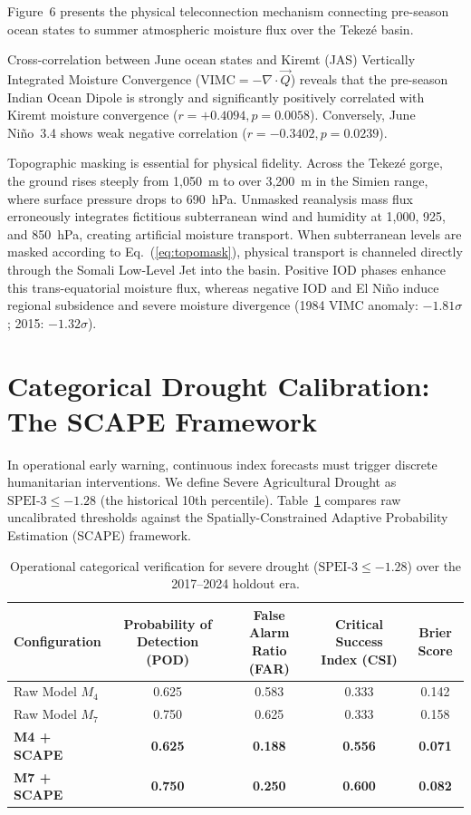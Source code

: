 \documentclass{article}
\begin{document}
Figure~6 presents the physical teleconnection mechanism connecting pre-season ocean states to summer atmospheric moisture flux over the Tekez\'{e} basin. 

Cross-correlation between June ocean states and Kiremt (JAS) Vertically Integrated Moisture Convergence ($\text{VIMC} = -\nabla \cdot \vec{Q}$) reveals that the pre-season Indian Ocean Dipole is strongly and significantly positively correlated with Kiremt moisture convergence ($r = +0.4094, p = 0.0058$). Conversely, June Ni\~{n}o~3.4 shows weak negative correlation ($r = -0.3402, p = 0.0239$).

Topographic masking is essential for physical fidelity. Across the Tekez\'{e} gorge, the ground rises steeply from 1,050~m to over 3,200~m in the Simien range, where surface pressure drops to 690~hPa. Unmasked reanalysis mass flux erroneously integrates fictitious subterranean wind and humidity at 1,000, 925, and 850~hPa, creating artificial moisture transport. When subterranean levels are masked according to Eq.~(\ref{eq:topomask}), physical transport is channeled directly through the Somali Low-Level Jet into the basin. Positive IOD phases enhance this trans-equatorial moisture flux, whereas negative IOD and El Ni\~{n}o induce regional subsidence and severe moisture divergence (1984 VIMC anomaly: $-1.81\sigma$; 2015: $-1.32\sigma$).

\section{Categorical Drought Calibration: The SCAPE Framework}
\label{sec:scape}
In operational early warning, continuous index forecasts must trigger discrete humanitarian interventions. We define Severe Agricultural Drought as $\text{SPEI-3} \le -1.28$ (the historical 10th percentile). Table~\ref{tab:scape} compares raw uncalibrated thresholds against the Spatially-Constrained Adaptive Probability Estimation (SCAPE) framework.

\begin{table}[H]
\centering
\caption{Operational categorical verification for severe drought ($\text{SPEI-3} \le -1.28$) over the 2017--2024 holdout era.}
\label{tab:scape}
\begin{tabular}{l cccc}
\toprule
\textbf{Configuration} & \textbf{Probability of Detection (POD)} & \textbf{False Alarm Ratio (FAR)} & \textbf{Critical Success Index (CSI)} & \textbf{Brier Score} \\
\midrule
Raw Model $M_4$ & 0.625 & 0.583 & 0.333 & 0.142 \\
Raw Model $M_7$ & 0.750 & 0.625 & 0.333 & 0.158 \\
\textbf{M4 + SCAPE} & \textbf{0.625} & \textbf{0.188} & \textbf{0.556} & \textbf{0.071} \\
\textbf{M7 + SCAPE} & \textbf{0.750} & \textbf{0.250} & \textbf{0.600} & \textbf{0.082} \\
\bottomrule
\end{tabular}
\end{table}
\end{document}
